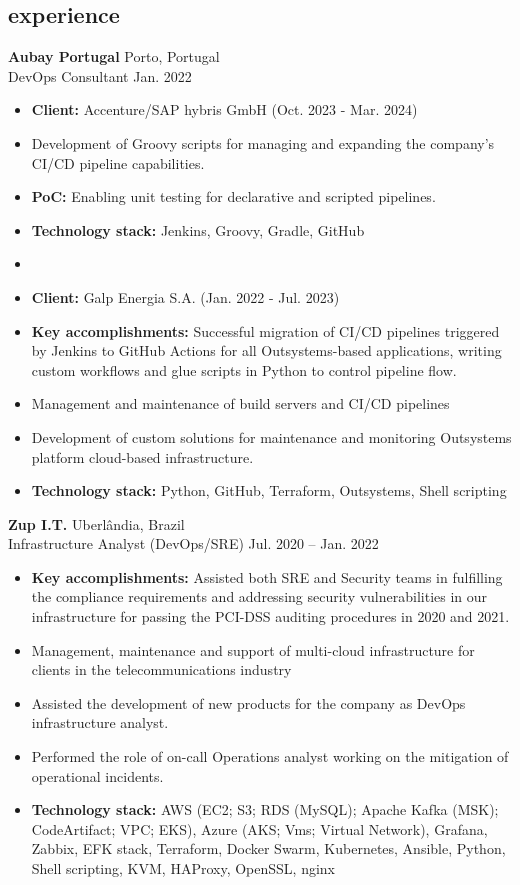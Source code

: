 \documentclass[12pt]{article}
\newcommand{\entry}[4]{{{\textbf{#1}}} \hfill #3 \\ #2 \hfill #4}
\begin{document}
\begin{paracol}{2}
\switchcolumn*

\section{experience}

\entry{Aubay Portugal}{DevOps Consultant}{Porto, Portugal}{Jan. 2022}
\begin{itemize}[noitemsep,leftmargin=3.5mm,rightmargin=0mm,topsep=6pt]
  \item \textbf{Client:} Accenture/SAP hybris GmbH (Oct. 2023 - Mar. 2024) 
  \item Development of Groovy scripts for managing and expanding the company's CI/CD pipeline capabilities.
  \item \textbf{PoC:} Enabling unit testing for declarative and scripted pipelines.
  \item \textbf{Technology stack:} Jenkins, Groovy, Gradle, GitHub
  \item
  \item \textbf{Client:} Galp Energia S.A. (Jan. 2022 - Jul. 2023)
  \item \textbf{Key accomplishments:} Successful migration of CI/CD pipelines triggered by Jenkins to GitHub Actions for all Outsystems-based applications, writing custom workflows and glue scripts in Python to control pipeline flow.
  \item Management and maintenance of build servers and CI/CD pipelines
  \item Development of custom solutions for maintenance and monitoring Outsystems platform cloud-based
  infrastructure.
  \item \textbf{Technology stack:} Python, GitHub, Terraform, Outsystems, Shell scripting
\end{itemize}

\medskip

\entry{Zup I.T.}{Infrastructure Analyst (DevOps/SRE)}{Uberlândia, Brazil}{Jul. 2020 -- Jan. 2022}
\begin{itemize}[noitemsep,leftmargin=3.5mm,rightmargin=0mm,topsep=6pt]
  \item \textbf{Key accomplishments:} Assisted both SRE and Security teams in fulfilling the compliance requirements and addressing security vulnerabilities in our infrastructure for passing the PCI-DSS auditing procedures in 2020 and 2021.
  \item Management, maintenance and support of multi-cloud
  infrastructure for clients in the telecommunications industry
  \item Assisted the development of new products for the company as DevOps
  infrastructure analyst.
  \item Performed the role of on-call Operations analyst working on the mitigation
  of operational incidents.
  \item \textbf{Technology stack:} AWS (EC2; S3; RDS (MySQL); Apache Kafka
  (MSK); CodeArtifact; VPC; EKS), Azure (AKS;
  Vms; Virtual Network), Grafana, Zabbix, EFK
  stack, Terraform, Docker Swarm, Kubernetes, Ansible, Python, Shell scripting,
  KVM, HAProxy, OpenSSL, nginx
\end{itemize}


\end{paracol}
\end{document}
